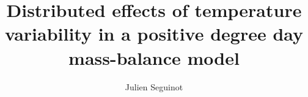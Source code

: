 \documentclass[twocolumn]{igs}
\begin{document}
\title[Temperature variability in a positive degree day model]{Distributed effects of temperature variability in a positive degree day mass-balance model}
\author[J. Seguinot]{Julien Seguinot}

\maketitle


%
%
\end{document}
